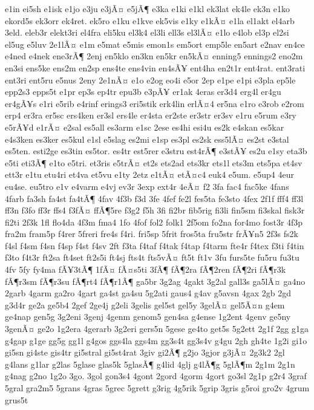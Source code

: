 {e1in
ei5sh
e1isk
e1jo
e3ju
e3jÃ¤
e5jÃ¶
e3ka
e1ki
e1kl
ek3lat
ek4le
ek3n
e1ko
ekord5s
ek3orr
ek4ret.
ek5ro
e1ku
e1kve
ek5vis
e1ky
e1kÃ¤
e1la
el1akt
el4arb
3eld.
eleb3r
elekt3ri
el4fra
eli5ku
el3k4
el3li
ell3s
el3lÃ¤
e1lo
e4lob
el3p
el2si
el5ug
e5luv
2e1lÃ¤
e1m
e5mat
e5mis
emon1s
em5ort
emp5le
en5art
e2nav
en4ce
e4ned
e4nek
ene3rÃ¶
2enj
en5klo
en3kn
en5kr
en5kÃ¤
enning5
ennings2
eno2m
en3si
ens5ke
ens2m
en2sp
ens4te
ens4vin
en4sÃ¥
ent4ha
en2t1r
ent4rat.
ent3rati
ent3ri
ent5ru
e5nus
2eny
2e1nÃ¤
e1o
e2og
eo4i
e5or
2ep
e1pe
e1pi
e3pla
ep5le
epp2s3
epps5t
e1pr
ep3s
ep4tr
epu3b
e3pÃ¥
er1ak
4eras
er3d4
erg4l
er4gu
er4gÃ¥s
e1ri
e5rib
e4rinf
erings3
eri5stik
erk4lin
erlÃ¤4
er5na
e1ro
e3rob
e2rom
erp4
er3ra
er5sc
ers4ken
er3sl
ers4le
er4sta
er2ste
er3str
er3sv
e1ru
e5rum
e3ry
e5rÃ¥d
e1rÃ¤
e2sal
es5all
es3arm
e1sc
2ese
es4hi
esi4u
es2k
e4skan
es5kar
e4s3ken
es3ker
es5kul
e1sl
e5slag
es2mi
e1sp
es3pl
es2sk
ess5lÃ¤
es2st
e3stal
es5ten.
esti2ge
es3tin
es5tor.
es4tr
est5rer
e3stru
est4rÃ¶
e3stÃ¥
es2u
e1sy
eta3b
e5ti
eti3Ã¶
e1to
e5tri.
et3ris
e5trÃ¤
et2s
ets2ad
ets3kr
ets1l
ets3m
ets5pa
et4sv
ett3r
e1tu
etu4ri
et4va
et5vu
e1ty
2etz
e1tÃ¤
etÃ¤c4
euk4
e5um.
e5up4
4eur
eu4se.
eu5tro
e1v
e4varm
e4vj
ev3r
3exp
ext4r
4eÃ¤
f2
3fa
fac4
fac5ke
4fans
4farb
fa3sh
fa4st
fa4tÃ¶
4fav
4f3b
f3d
3fe
4fef
fe2l
fes5ta
fe3sto
4fex
2f1f
fff4
ff3l
ff3n
f3fo
ff3r
ffs4
f3fÃ¤
ffÃ¶5re
f3g2
f5h
3fi
fi2br
fib5rig
fi3li
fin5sm
fi3skal
fisk3r
fi2ti
2f3k
1fl
flo4da
4f3m
fma4
1fo
4fof
fol2
folk1
2f5om
fo2na
for4mo
fost3r
4f3p
fra2m
fram5p
f4rer
5freri
fre4s
f4ri.
fri5sp
5frit
fros5ta
fru5str
frÃ¥n5
2f3s
fs2k
f4sl
f4sm
f4sn
f4sp
f4st
f4sv
2ft
f3ta
f4taf
f4tak
f4tap
f4tarm
fte4r
f4tex
f3ti
f4tin
f3to
f4t3r
ft2sa
ft4set
ft2s5i
ft4sj
fts4t
fts5vÃ¤
ft5t
ft1v
3fu
furs5te
fu5ru
fu3tu
4fv
5fy
fy4ma
fÃ¥3tÃ¶
1fÃ¤
fÃ¤s5ti
3fÃ¶
fÃ¶2ra
fÃ¶2ren
fÃ¶2ri
fÃ¶r3k
fÃ¶r3sm
fÃ¶r3su
fÃ¶rt4
fÃ¶r1Ã¶
ga5br
3g2ag
4gakt
3g2al
gall3s
ga5lÃ¤
ga4no
2garb
4garm
ga2ro
4gart
ga4st
ga4su
5g2ati
gaus4
g4av
g5avsn
4gax
2gb
2gd
g3d4r
ge2a
ge5b4
2gef
2ge4j
g2eli
3gelis
gel5st
gel5y
3gelÃ¤
gel5Ã¤n
g4em
ge4nap
gen5g
3g2eni
3genj
4genm
genom5
gen4sa
g4ense
1g2ent
4genv
ge5ny
3genÃ¤
ge2o
1g2era
4gerarb
3g2eri
gers5n
5gese
ge4to
get5s
5g2ett
2g1f
2gg
g1ga
g4gap
g1ge
gg5g
gg1l
g4gos
ggs4la
ggs4m
gg3s4t
gg3s4v
g4gu
2gh
gh4te
1g2i
gi1o
gi5sn
gi4ste
gis4tr
gi5stral
gi5st4rat
3giv
gi2Ã¶
g2jo
3gjor
g3jÃ¤
2g3k2
2gl
g4lans
g1lar
g2las
5glase
glas5k
5glasÃ¶
g4lid
4glj
g4lÃ¶g
5glÃ¶m
2g1m
2g1n
g4nag
g2no
1g2o
3go.
3gol
gon3s4
4gont
2gord
4gorm
4gort
go3sl
2g1p
g2r4
3graf
5gral
gra2m5
5grans
4gras
5grec
5grett
g3rig
4g5rik
5grip
3gris
g5roi
gro2v
4grum
grus5t
}
